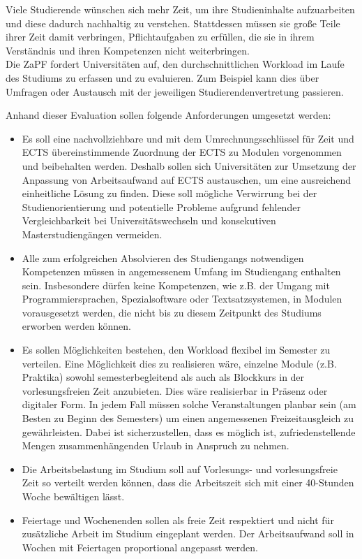 \documentclass[DIV=calc]{scrartcl}
\begin{document}
Viele Studierende wünschen sich mehr Zeit, um ihre Studieninhalte aufzuarbeiten und diese dadurch nachhaltig zu verstehen. Stattdessen müssen sie große Teile ihrer Zeit damit verbringen, Pflichtaufgaben zu erfüllen, die sie in ihrem Verständnis und ihren Kompetenzen nicht weiterbringen.\\
Die ZaPF fordert Universitäten auf, den durchschnittlichen Workload im Laufe des Studiums zu erfassen und zu evaluieren. Zum Beispiel kann dies über Umfragen oder Austausch mit der jeweiligen Studierendenvertretung passieren.

Anhand dieser Evaluation sollen folgende Anforderungen umgesetzt werden:
\begin{itemize}
    \item Es soll eine nachvollziehbare und mit dem Umrechnungsschlüssel für Zeit und ECTS übereinstimmende Zuordnung der ECTS zu Modulen vorgenommen und beibehalten werden. Deshalb sollen sich Universitäten zur Umsetzung der Anpassung von Arbeitsaufwand auf ECTS austauschen, um eine ausreichend einheitliche Lösung zu finden. Diese soll mögliche Verwirrung bei der Studienorientierung und potentielle Probleme aufgrund fehlender Vergleichbarkeit bei Universitätswechseln und konsekutiven Masterstudiengängen vermeiden.
    \item Alle zum erfolgreichen Absolvieren des Studiengangs notwendigen Kompetenzen müssen in angemessenem Umfang im Studiengang enthalten sein. Insbesondere dürfen keine Kompetenzen, wie z.B. der Umgang mit Programmiersprachen, Spezialsoftware oder Textsatzsystemen, in Modulen vorausgesetzt werden, die nicht bis zu diesem Zeitpunkt des Studiums erworben werden können.
    \item Es sollen Möglichkeiten bestehen, den Workload flexibel im Semester zu verteilen. Eine Möglichkeit dies zu realisieren wäre, einzelne Module (z.B. Praktika) sowohl semesterbegleitend als auch als Blockkurs in der vorlesungsfreien Zeit anzubieten. Dies wäre realisierbar in Präsenz oder digitaler Form. In jedem Fall müssen solche Veranstaltungen planbar sein (am Besten zu Beginn des Semesters) um einen angemessenen Freizeitausgleich zu gewährleisten. Dabei ist sicherzustellen, dass es möglich ist, zufriedenstellende Mengen zusammenhängenden Urlaub in Anspruch zu nehmen.
    \item Die Arbeitsbelastung im Studium soll auf Vorlesungs- und vorlesungsfreie Zeit so verteilt werden können, dass die Arbeitszeit sich mit einer 40-Stunden Woche bewältigen lässt.
    \item Feiertage und Wochenenden sollen als freie Zeit respektiert und nicht für zusätzliche Arbeit im Studium eingeplant werden. Der Arbeitsaufwand soll in Wochen mit Feiertagen proportional angepasst werden.

\end{itemize}
\end{document}
